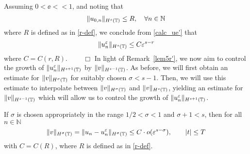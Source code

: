 Assuming $0 < \ee <<1$, and noting that
\begin{equation*}
\begin{split}
\|u_{0,n}\|_{H^s(\mathbb{T})} \le R, \quad \forall n \in \mathbb{N}
\end{split}
\end{equation*}
where $R$ is defined as in \eqref{r-def},
we conclude from \eqref{calc_ue'} that 
\begin{equation*}
\begin{split}
\|u^\varepsilon_n\|_{H^s(\mathbb{T})} \le C \varepsilon^{s-r}
\end{split}
\end{equation*}
where $C = C(r, R)$. $\qquad \Box$
%
In light of Remark~\ref{lem5r'}, we now aim to control the growth of
$\|u^\varepsilon_n\|_{H^{s+1}(\mathbb{T})}$ by $\|v\|_{H^{s-1}(\mathbb{T})}$. As before, we will
first obtain an estimate for $\|v\|_{H^\sigma(\mathbb{T})}$ for suitably chosen
$\sigma < s-1$. Then, we will use this estimate to interpolate between
$\|v\|_{H^\sigma(\mathbb{T})}$ and $\|v\|_{H^s(\mathbb{T})}$, yielding an estimate for
$\|v\|_{H^{s-1}(\mathbb{T})}$ which will allow us to control the growth of
$\|u^\varepsilon_n\|_{H^{s+1}(\mathbb{T})}$. 
%
%
%
%
\begin{proposition}
\label{prop:180}
If $\sigma$ is chosen appropriately in the range $1/2 < \sigma < 1$ and
$\sigma + 1 < s$, then for all $n \in \mathbb{N}$ 
\begin{equation}
\label{alem6rq}
\begin{split}
\|v\|_{H^{\sigma}(\mathbb{T})} = 
\|u_n - u^\varepsilon_n\|_{H^\sigma(\mathbb{T})}
\le C \cdot o(\varepsilon^{s- \sigma }), \qquad |t| \le T
\end{split}
\end{equation}
with $C = C(R)$, where $R$ is defined as in \eqref{r-def}.
\end{proposition}
%
%
%
